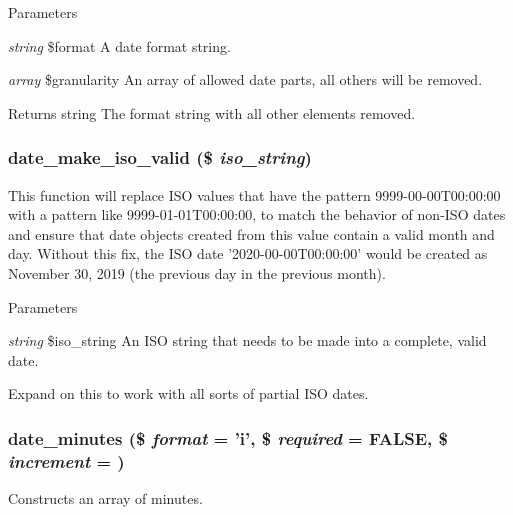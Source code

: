 \begin{DoxyParams}{Parameters}
\item[{\em string}]\$format A date format string. \item[{\em array}]\$granularity An array of allowed date parts, all others will be removed.\end{DoxyParams}
\begin{DoxyReturn}{Returns}
string The format string with all other elements removed. 
\end{DoxyReturn}
\hypertarget{date__api_8module_afef4f46bfc76d3242b4ad842aa0fd225}{
\subsubsection[{date\_\-make\_\-iso\_\-valid}]{\setlength{\rightskip}{0pt plus 5cm}date\_\-make\_\-iso\_\-valid (\$ {\em iso\_\-string})}}
\label{date__api_8module_afef4f46bfc76d3242b4ad842aa0fd225}
This function will replace ISO values that have the pattern 9999-\/00-\/00T00:00:00 with a pattern like 9999-\/01-\/01T00:00:00, to match the behavior of non-\/ISO dates and ensure that date objects created from this value contain a valid month and day. Without this fix, the ISO date '2020-\/00-\/00T00:00:00' would be created as November 30, 2019 (the previous day in the previous month).


\begin{DoxyParams}{Parameters}
\item[{\em string}]\$iso\_\-string An ISO string that needs to be made into a complete, valid date.\end{DoxyParams}
Expand on this to work with all sorts of partial ISO dates. \hypertarget{date__api_8module_ab545057ba7104d45f9a4424ba2c26227}{
\subsubsection[{date\_\-minutes}]{\setlength{\rightskip}{0pt plus 5cm}date\_\-minutes (\$ {\em format} = {\ttfamily 'i'}, \/  \$ {\em required} = {\ttfamily FALSE}, \/  \$ {\em increment} = {})}}
\label{date__api_8module_ab545057ba7104d45f9a4424ba2c26227}
Constructs an array of minutes.


